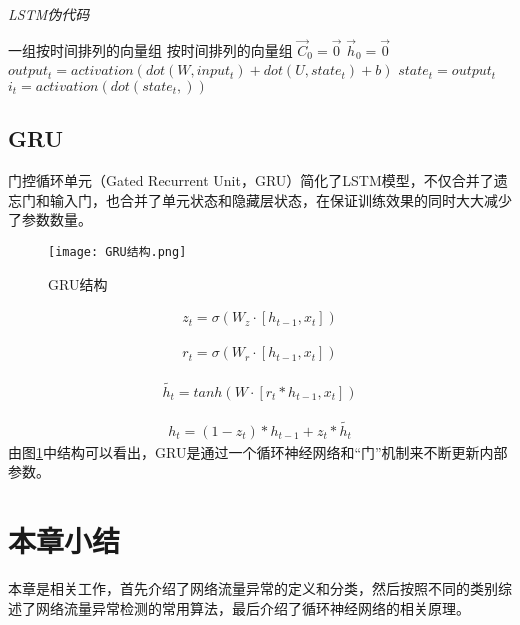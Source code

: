 \begin{algorithm}[!h]
  \caption{\emph{LSTM伪代码}}
  \begin{algorithmic}[1]
      \Require 一组按时间排列的向量组
      \Ensure 按时间排列的向量组
      \State $\vec C_0 = \vec 0$
      \State $\vec h_0 = \vec 0$
      \State $output_t = activation(dot(W, input_t) + dot(U, state_t) + b)$
      \State $state_t = output_t$
      \State $i_t = activation(dot(state_t,))$
      

      \EndFor
  \end{algorithmic}
\end{algorithm}


\subsection{GRU}
门控循环单元（Gated Recurrent Unit，GRU）简化了LSTM模型，不仅合并了遗忘门和输入门，也合并了单元状态和隐藏层状态，在保证训练效果的同时大大减少了参数数量。
\begin{figure}
    \centering
    \texttt{[image: GRU结构.png]}
    \caption{GRU结构}
    \label{fig:GRU结构}
  \end{figure}

  \begin{equation}
    \begin{aligned}
        z_t = \sigma(W_z\cdot [h_{t-1},x_t])
    \end{aligned}
\end{equation}

\begin{equation}
    \begin{aligned}
        r_t = \sigma(W_r\cdot[h_{t-1},x_t])
    \end{aligned}
\end{equation}

\begin{equation}
    \begin{aligned}
        \widetilde {h_t} = tanh(W\cdot[r_t * h_{t-1}, x_t])
    \end{aligned}
\end{equation}

\begin{equation}
    \begin{aligned}
        h_t = (1- z_t) * h_{t-1} + z_t * \widetilde{h_t}
    \end{aligned}
\end{equation}
由图\ref{fig:GRU结构}中结构可以看出\cite{rnn-structure}，GRU是通过一个循环神经网络和“门”机制来不断更新内部参数。


\section{本章小结}
本章是相关工作，首先介绍了网络流量异常的定义和分类，然后按照不同的类别综述了网络流量异常检测的常用算法，最后介绍了循环神经网络的相关原理。
